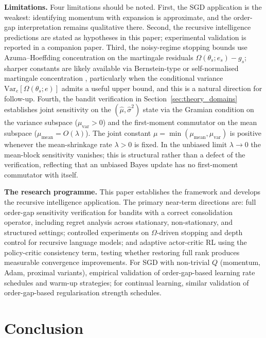 \documentclass[12pt,a4paper]{article}
\newcommand{\Ogap}{\Omega}
\begin{document}
\textbf{Limitations.}
Four limitations should be noted. First, the SGD application is the weakest:
identifying momentum with expansion is approximate, and the order-gap
interpretation remains qualitative there. Second, the recursive intelligence
predictions are stated as hypotheses in this paper; experimental validation
is reported in a companion paper. Third, the noisy-regime stopping bounds
use Azuma--Hoeffding concentration on the martingale residuals
$\Ogap(\theta_s; e_s) - g_s$; sharper constants are likely available via
Bernstein-type or self-normalised martingale concentration
\citep{howard2021timeuniform}, particularly when the conditional variance
$\mathrm{Var}_e[\Ogap(\theta_s; e)]$ admits a useful upper bound, and this
is a natural direction for follow-up. Fourth, the bandit verification in
Section~\ref{sec:theory_domains} establishes joint sensitivity on the
$(\hat\mu, \hat\sigma^2)$ state via the Gramian condition on the variance
subspace ($\mu_{\mathrm{var}} > 0$) and the first-moment commutator on the
mean subspace ($\mu_{\mathrm{mean}} = O(\lambda)$). The joint constant
$\mu = \min(\mu_{\mathrm{mean}}, \mu_{\mathrm{var}})$ is positive whenever
the mean-shrinkage rate $\lambda > 0$ is fixed. In the unbiased limit
$\lambda \to 0$ the mean-block sensitivity vanishes; this is structural
rather than a defect of the verification, reflecting that an unbiased Bayes
update has no first-moment commutator with itself.

\textbf{The research programme.}
This paper establishes the framework and develops the recursive intelligence
application. The primary near-term directions are: full order-gap sensitivity
verification for bandits with a correct consolidation operator, including
regret analysis across stationary, non-stationary, and structured settings;
controlled experiments on $\Ogap$-driven stopping and depth control for
recursive language models; and adaptive actor-critic RL using the
policy-critic consistency term, testing whether restoring full rank produces
measurable convergence improvements. For SGD with non-trivial $Q$ (momentum,
Adam, proximal variants), empirical validation of order-gap-based learning
rate schedules and warm-up strategies; for continual learning, similar
validation of order-gap-based regularisation strength schedules.

\section{Conclusion}
\label{sec:conclusion}
\end{document}
